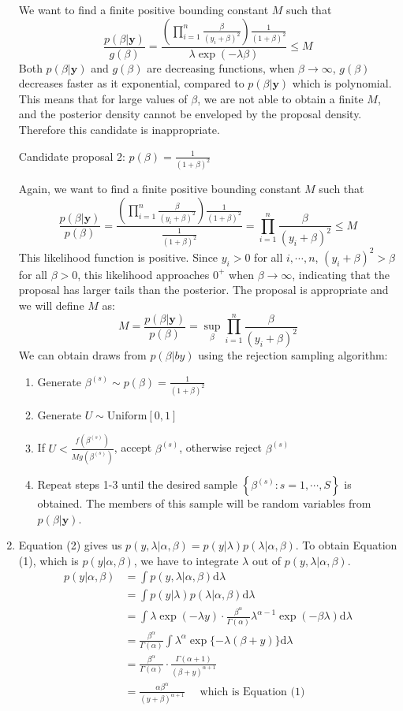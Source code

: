 \documentclass[a4paper,12pt]{article}\usepackage[]{graphicx}\usepackage[]{color}
\newcommand{\by}{\mathbf{y}}
\newcommand{\Uniform}{\mathrm{Uniform}}
\newcommand{\id}{\mathrm{d}}
\begin{document}
\begin{enumerate}[label=(\alph*)]
We want to find a finite positive bounding constant $M$ such that
$$\frac{p(\beta|\by)}{g(\beta)}=\frac{\left(\prod_{i=1}^n\frac{\beta}{(y_i+\beta)^2}\right)\frac{1}{(1+\beta)^2}}{\lambda\exp(-\lambda\beta)}\leq M$$
Both $p(\beta|\by)$ and $g(\beta)$ are decreasing functions, when $\beta\rightarrow\infty$, $g(\beta)$ decreases faster as it exponential, compared to $p(\beta|\by)$ which is polynomial. This means that for large values of $\beta$, we are not able to obtain a finite $M$, and the posterior density cannot be enveloped by the proposal density. Therefore this candidate is inappropriate.

Candidate proposal 2: $p(\beta)=\frac{1}{(1+\beta)^2}$

Again, we want to find a finite positive bounding constant $M$ such that
$$\frac{p(\beta|\by)}{p(\beta)}=\frac{\left(\prod_{i=1}^n\frac{\beta}{(y_i+\beta)^2}\right)\frac{1}{(1+\beta)^2}}{\frac{1}{(1+\beta)^2}}=\prod_{i=1}^n\frac{\beta}{(y_i+\beta)^2}\leq M$$
This likelihood function is positive. Since $y_i>0$ for all $i,\cdots,n$, $(y_i+\beta)^2>\beta$ for all $\beta>0$, this likelihood approaches $0^{+}$ when $\beta\rightarrow\infty$, indicating that the proposal has larger tails than the posterior. The proposal is appropriate and we will define $M$ as:
$$M=\frac{p(\beta|\by)}{p(\beta)}=\sup_{\beta}\prod_{i=1}^n\frac{\beta}{(y_i+\beta)^2}$$
We can obtain draws from $p(\beta|by)$ using the rejection sampling algorithm:
\begin{enumerate}[label=(\arabic*)]
	\item Generate $\beta^{(s)}\sim p(\beta)=\frac{1}{(1+\beta)^2}$
	\item Generate $U\sim\Uniform[0,1]$
	\item If $U<\frac{f(\beta^{(s)})}{Mg(\beta^{(s)})}$, accept $\beta^{(s)}$, otherwise reject $\beta^{(s)}$
	\item Repeat steps 1-3 until the desired sample $\left\{\beta^{(s)}:s=1,\cdots,S\right\}$ is obtained. The members of this sample will be random variables from $p(\beta|\by)$.
\end{enumerate}

\item Equation (2) gives us $p(y,\lambda|\alpha,\beta)=p(y|\lambda)p(\lambda|\alpha,\beta)$. To obtain Equation (1), which is $p(y|\alpha,\beta)$, we have to integrate $\lambda$ out of $p(y,\lambda|\alpha,\beta)$.
\begin{align*}
p(y|\alpha,\beta)&=\int p(y,\lambda|\alpha,\beta) \id\lambda \\
&= \int p(y|\lambda)p(\lambda|\alpha,\beta) \id\lambda \\
&= \int \lambda\exp(-\lambda y)\cdot \frac{\beta^\alpha}{\Gamma(\alpha)}\lambda^{\alpha-1}\exp(-\beta\lambda) \id\lambda\\
&= \frac{\beta^\alpha}{\Gamma(\alpha)}\int \lambda^\alpha\exp\{-\lambda(\beta+y)\} \id\lambda\\
&= \frac{\beta^\alpha}{\Gamma(\alpha)}\cdot\frac{\Gamma(\alpha+1)}{(\beta+y)^{\alpha+1}} \\
&= \frac{\alpha\beta^\alpha}{(y+\beta)^{\alpha+1}} \quad \textrm{\ which\ is\ Equation\ (1)}
\end{align*}
\end{enumerate}
\newpage
\end{document}

